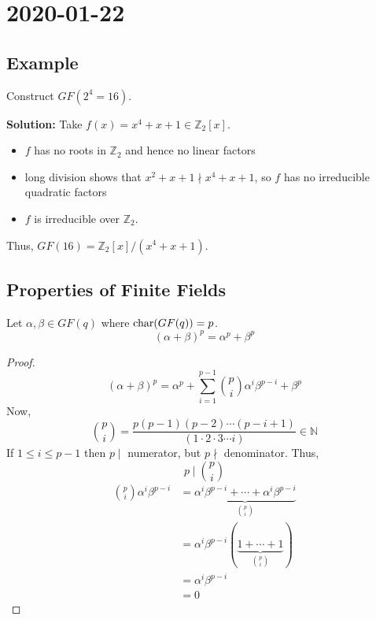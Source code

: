 \section{2020-01-22}
\begin{exbox}
    \subsection{Example}
    Construct $ GF(2^4=16) $.
    
    \textbf{Solution:} Take $ f(x)=x^4+x+1\in\mathbb{Z}_2[x] $.
    \begin{itemize}
        \item $ f $ has no roots in $ \mathbb{Z}_2 $ and hence no linear factors
        \item long division shows that $ x^2+x+1\nmid x^4+x+1 $, so $ f $
        has no irreducible quadratic factors
        \item $ f $ is irreducible over $ \mathbb{Z}_2 $.
    \end{itemize}
    Thus, $ GF(16)=\mathbb{Z}_2[x]/(x^4+x+1) $.
\end{exbox}

\subsection{Properties of Finite Fields}
\begin{thmbox}
    \begin{theorem}
    Let $ \alpha,\beta\in GF(q) $ where $ \operatorname{char}(GF(q))=p $.
    \[ (\alpha + \beta)^p=\alpha^p+\beta^p \]
\end{theorem} \end{thmbox}

\begin{proof}
    \[ (\alpha + \beta)^p=\alpha^p+\sum\limits_{i=1}^{p-1}
    \binom{p}{i}\alpha^i\beta^{p-i}+\beta^p \]
    Now,
    \[ \binom{p}{i}=\frac{p(p-1)(p-2)\cdots (p-i+1)}{(1\cdot 2\cdot 3\cdots i)}
    \in\mathbb{N} \]
    If $ 1\leqslant i\leqslant p-1 $ then $ p\mid $ numerator, but
    $ p \nmid $ denominator. Thus,
    \[ p\mid \binom{p}{i} \]
    \begin{align*}
        \binom{p}{i}\alpha^i\beta^{p-i}
        &=\underbrace{\alpha^i\beta^{p-i}+\cdots+\alpha^i\beta^{p-i}}_{\binom{p}{i}}\\
        &=\alpha^i\beta^{p-i}\left( \underbrace{1+\cdots+1}_{\binom{p}{i}} \right)\\
        &=\alpha^i\beta^{p-i}\\
        &=0
    \end{align*}
\end{proof}

